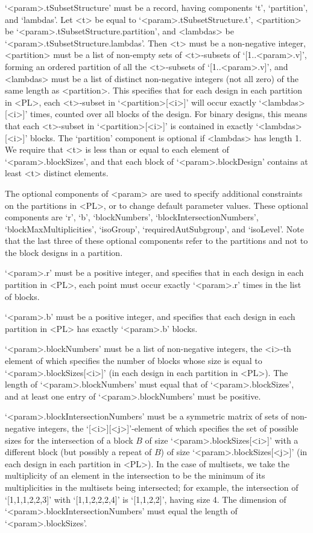 `<param>.tSubsetStructure' must be a record, having
components `t', `partition', and `lambdas'. Let <t> be
equal to `<param>.tSubsetStructure.t', <partition> be
`<param>.tSubsetStructure.partition', and <lambdas> be
`<param>.tSubsetStructure.lambdas'.  Then <t> must be a non-negative
integer, <partition> must be a list of non-empty sets of <t>-subsets of
`[1..<param>.v]', forming an ordered partition of all the <t>-subsets of
`[1..<param>.v]', and <lambdas> must be a list of distinct non-negative
integers (not all zero) of the same length as <partition>. This specifies
that for each design in each partition in <PL>, each <t>-subset in
`<partition>[<i>]' will occur exactly `<lambdas>[<i>]' times, counted
over all blocks of the design.  For binary designs, this means that each
<t>-subset in `<partition>[<i>]' is contained in exactly `<lambdas>[<i>]'
blocks.  The `partition' component is optional if <lambdas> has length 1.
We require that <t> is less than or equal to each element of
`<param>.blockSizes', and that each block of `<param>.blockDesign'
contains at least <t> distinct elements.

The optional components of <param> are used to specify additional
constraints on the partitions in <PL>, or to change default parameter
values. These optional components are `r', `b', `blockNumbers',
`blockIntersectionNumbers', `blockMaxMultiplicities', `isoGroup',
`requiredAutSubgroup', and `isoLevel'. Note that the last three of these
optional components refer to the partitions and not to the block designs
in a partition.

`<param>.r' must be a positive integer, and specifies that in each design
in each partition in <PL>, each point must occur exactly `<param>.r'
times in the list of blocks.

`<param>.b' must be a positive integer, and specifies that each design
in each partition in <PL> has exactly `<param>.b' blocks.

`<param>.blockNumbers' must be a list of non-negative integers, the <i>-th
element of which specifies the number of blocks whose size is equal to
`<param>.blockSizes[<i>]' (in each design in each partition in <PL>). The
length of `<param>.blockNumbers' must equal that of `<param>.blockSizes',
and at least one entry of `<param>.blockNumbers' must be positive.

`<param>.blockIntersectionNumbers' must be a symmetric matrix of sets
of non-negative integers, the `[<i>][<j>]'-element of which specifies
the set of possible sizes for the intersection of a block $B$ of size
`<param>.blockSizes[<i>]' with a different block (but possibly a repeat of
$B$) of size `<param>.blockSizes[<j>]' (in each design in each partition
in <PL>). In the case of multisets, we take the multiplicity of an
element in the intersection to be the minimum of its multiplicities in
the multisets being intersected; for example, the intersection of
`[1,1,1,2,2,3]' with `[1,1,2,2,2,4]' is `[1,1,2,2]', having size 4.
The dimension of `<param>.blockIntersectionNumbers' must equal the length
of `<param>.blockSizes'.

